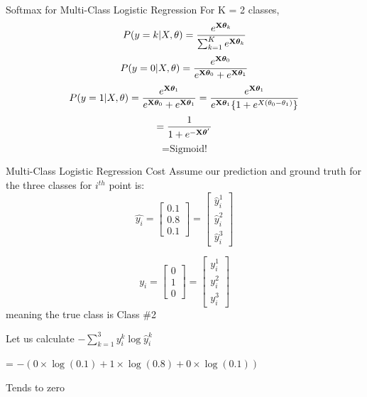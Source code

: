 \documentclass{beamer}
\begin{document}
\begin{frame}{Softmax for Multi-Class Logistic Regression}
For K = 2 classes,
\begin{equation*}
P(y = k|X, \theta) = \frac{e^{\mathbf{X}\boldsymbol{\theta}_{k}}}{\sum_{k=1}^{K}e^{\mathbf{X}\boldsymbol{\theta}_{k}}}
\end{equation*}
\begin{equation*}
P(y = 0|X, \theta) = \frac{e^{\mathbf{X}\boldsymbol{\theta}_{0}}}{e^{\mathbf{X}\boldsymbol{\theta}_{0}} + e^{\mathbf{X}\boldsymbol{\theta}_{1}}}
\end{equation*}
\begin{equation*}
P(y = 1|X, \theta) = \frac{e^{\mathbf{X}\boldsymbol{\theta}_{1}}}{e^{\mathbf{X}\boldsymbol{\theta}_{0}} + e^{\mathbf{X}\boldsymbol{\theta}_{1}}} = \frac{e^{\mathbf{X}\boldsymbol{\theta}_{1}}}{e^{\mathbf{X}\boldsymbol{\theta}_{1}}\{1 + e^{X(\theta_{0} - \theta_{1})}\}}
\end{equation*}
\begin{equation*}
= \frac{1}{1 + e^{-\mathbf{X}\boldsymbol{\theta}^{'}}}
\end{equation*}
\begin{equation*}
= \text{Sigmoid!}
\end{equation*}
\end{frame}

\begin{frame}{Multi-Class Logistic Regression Cost}
Assume our prediction and ground truth  for the three classes for $i^{th}$ point is:
$$
\hat{y_i} = \begin{bmatrix}
	0.1\\0.8\\0.1
\end{bmatrix} = \begin{bmatrix}
\hat{y}_i^1\\\hat{y}_i^2\\\hat{y}_i^3
\end{bmatrix} 
$$

$$
y_i = \begin{bmatrix}
0\\1\\0
\end{bmatrix}=\begin{bmatrix}
y_i^1\\y_i^2\\ y_i^3
\end{bmatrix}
$$
meaning the true class is Class \#2

\pause Let us calculate $-\sum_{k=1}^{3}y_i^k \log{\hat{y}_i^k} $

\pause  = $-(0\times \log(0.1) + 1\times \log(0.8) + 0\times \log(0.1))$

\pause Tends to zero

\end{frame}
\end{document}
